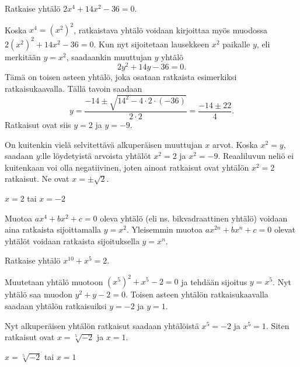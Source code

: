 \begin{esimerkki}
Ratkaise yhtälö $2x^4+14x^2-36=0$.

\begin{esimratk}
Koska $x^4=(x^2)^2$, ratkaistava yhtälö voidaan kirjoittaa myös muodossa $2(x^2)^2+14x^2-36=0$.
Kun nyt sijoitetaan lausekkeen $x^2$ paikalle $y$, eli merkitään $y=x^2$, saadaankin muuttujan $y$ yhtälö
\[
2y^2+14y-36=0.
\]
Tämä on toisen asteen yhtälö, joka osataan ratkaista esimerkiksi ratkaisukaavalla.
Tällä tavoin saadaan
\[
y=\frac{-14\pm\sqrt{14^2-4\cdot 2\cdot(-36)}}{2\cdot 2}=\frac{-14\pm 22}{4}.
\]
Ratkaisut ovat siis $y=2$ ja $y=-9$.

On kuitenkin vielä selvitettävä alkuperäisen muuttujan $x$ arvot.
Koska $x^2=y$, saadaan $y$:lle löydetyistä arvoista yhtälöt $x^2=2$ ja $x^2=-9$.
Reaaliluvun neliö ei kuitenkaan voi olla negatiivinen, joten ainoat ratkaisut ovat yhtälön $x^2 = 2$ ratkaisut.
Ne ovat $x=\pm\sqrt{2}$.
\end{esimratk}

\begin{esimvast}
$x=2$ tai $x=-2$
\end{esimvast}
\end{esimerkki}

Muotoa $ax^4+bx^2+c=0$ oleva yhtälö (eli ns. bikvadraattinen yhtälö) voidaan aina ratkaista sijoittamalla $y=x^2$.
Yleisemmin muotoa $ax^{2n}+bx^n+c=0$ olevat yhtälöt voidaan ratkaista sijoituksella $y = x^n$.

\begin{esimerkki}
Ratkaise yhtälö $x^{10}+x^5=2$.

\begin{esimratk}
Muutetaan yhtälö muotoon $(x^5)^2+x^5-2=0$ ja tehdään sijoitus $y = x^5$.
Nyt yhtälö saa muodon $y^2+y-2 = 0$.
Toisen asteen yhtälön ratkaisukaavalla saadaan yhtälön ratkaisuiksi $y = -2$ ja $y = 1$.

Nyt alkuperäisen yhtälön ratkaisut saadaan yhtälöistä $x^5=-2$ ja $x^5=1$. Siten ratkaisut ovat $x = \sqrt[5]{-2}$ ja $x = 1$.
\end{esimratk}

\begin{esimvast}
$x = \sqrt[5]{-2}$ tai $x = 1$
\end{esimvast}

\end{esimerkki}

